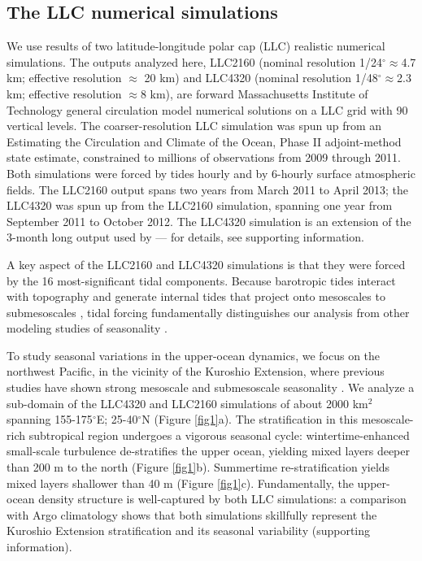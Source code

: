 \documentclass[grl]{agutex2015}
\begin{document}
\begin{article}
\section{The LLC numerical simulations}
We use results of two latitude-longitude polar cap (LLC)
realistic numerical simulations. The outputs
analyzed here, LLC2160 (nominal resolution 1/24$^\circ$$\approx$4.7 km;
effective resolution $\approx$ 20 km) and LLC4320
(nominal resolution 1/48$^\circ$$\approx$2.3 km;
effective resolution $\approx$8 km),   are
forward Massachusetts Institute of Technology general circulation model \citep[MITgcm; ][]{marshall_etal1997}
numerical solutions on a LLC grid  \citep{forget_etal2015} with
90 vertical levels. The coarser-resolution LLC simulation was
spun up from an Estimating the Circulation and Climate of the Ocean, Phase II \citep[ECCO2; ][]{menemenlis_etal2008}
adjoint-method state estimate, constrained to millions
of observations from 2009 through 2011. Both simulations were forced by
tides hourly and by 6-hourly surface atmospheric fields. The LLC2160
output spans two years from March 2011 to April 2013; the LLC4320 was spun up from
the LLC2160 simulation, spanning one year from September 2011 to October 2012.
The LLC4320 simulation is an extension of the 3-month long output used by
\citet{rocha_etal2016} --- for details, see supporting information.

A key aspect of the LLC2160 and LLC4320 simulations is that they were forced by
the 16 most-significant tidal components.
Because barotropic tides interact with topography and generate internal
tides that project onto mesoscales to submesoscales
\citep[e.g., ][]{rocha_etal2016}, tidal forcing fundamentally distinguishes our analysis
from other modeling studies of seasonality \citep{sasaki_etal2014,qiu_etal2014}.

To study seasonal variations in the upper-ocean dynamics, we focus on the northwest
Pacific, in the vicinity of the Kuroshio
Extension, where previous studies have shown strong mesoscale and submesoscale seasonality
\citep{sasaki_etal2014,qiu_etal2014}.
We analyze a sub-domain of the LLC4320 and LLC2160 simulations of about 2000 km$^2$
spanning 155-175$^\circ$E; 25-40$^\circ$N (Figure \ref{fig1}a). The stratification
in this mesoscale-rich subtropical region undergoes a vigorous seasonal cycle: wintertime-enhanced
small-scale turbulence de-stratifies the upper ocean, yielding mixed layers
deeper than 200 m to the north (Figure \ref{fig1}b). Summertime re-stratification yields mixed layers shallower
than 40 m (Figure \ref{fig1}c).
Fundamentally, the upper-ocean density structure is well-captured by both LLC simulations:
a comparison with Argo climatology shows that both simulations skillfully represent the Kuroshio
Extension stratification and its seasonal variability  (supporting information).


\end{article}
\end{document}
